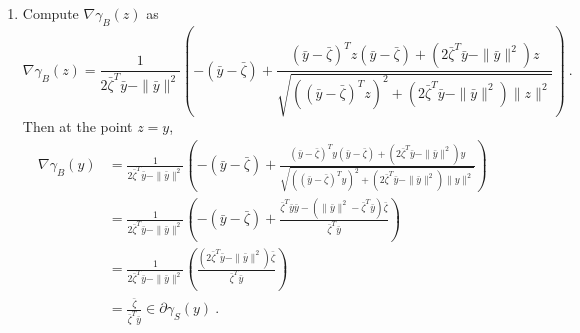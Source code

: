 \documentclass[sn-mathphys,Numbered]{sn-jnl}%
\begin{document}
\begin{appendices}
{\begin{enumerate}[label=(\alph*)]
\item Compute $\nabla \gamma_B(z)$ as
$$\nabla \gamma_B(z) = \frac{1}{2\bar \zeta ^T \bar y -\|\bar y\|^2}\left(-(\bar y- \bar \zeta)+\frac{(\bar y -\bar \zeta)^Tz(\bar y-\bar \zeta)+(2\bar \zeta^T\bar y -\|\bar y\|^2)z}{\sqrt{\left((\bar y -\bar \zeta)^Tz\right)^2+(2\bar \zeta^T \bar y -\|\bar y\|^2)\|z\|^2}}\right) \ .
$$
Then at the point $z=y$,
\begin{align*}
    \nabla \gamma_B(y) &= \frac{1}{2\bar \zeta ^T \bar y -\|\bar y\|^2}\left(-(\bar y- \bar \zeta)+\frac{(\bar y -\bar \zeta)^Ty(\bar y-\bar \zeta)+(2\bar \zeta^T\bar y -\|\bar y\|^2)y}{\sqrt{\left((\bar y -\bar \zeta)^Ty\right)^2+(2\bar \zeta^T \bar y -\|\bar y\|^2)\|y\|^2}}\right) \\
    &=\frac{1}{2\bar \zeta ^T \bar y -\|\bar y\|^2}\left(-(\bar y- \bar \zeta)+\frac{\bar \zeta ^T \bar y \bar y-(\|\bar y\|^2-\bar \zeta ^T \bar y)\bar \zeta}{\bar \zeta^T \bar y}\right) \\
    &=\frac{1}{2\bar \zeta ^T \bar y -\|\bar y\|^2}\left(\frac{(2\bar \zeta ^T \bar y -\|\bar y\|^2)\bar \zeta}{{ \bar \zeta ^T \bar y}}\right) \\
    &=\frac{\bar \zeta}{\bar \zeta^T \bar y} \in \partial \gamma_S(y) \ .
\end{align*}


\end{enumerate}}
\end{appendices}
\end{document}
